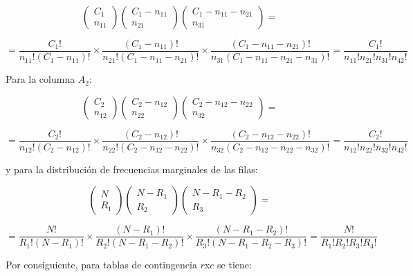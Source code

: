 \documentclass[12pt,a4paper,]{book}
\numberwithin{dummy}{section}
\theoremstyle{ocrenumbox}
\theoremstyle{blacknumex}
\theoremstyle{blacknumbox}
\theoremstyle{ocrenum}
\theoremstyle{ocrenum}
\begin{document}
\[
\left(\begin{array}{c}C_1\\ n_{11}\end{array}\right)\left(\begin{array}{c}C_1-n_{11}\\ n_{21}\end{array}\right)\left(\begin{array}{c}C_1-n_{11}-n_{21}\\ n_{31}\end{array}\right)=
\]

\[
=\frac{C_1!}{n_{11}!(C_1-n_{11})!}\times\frac{(C_1-n_{11})!}{n_{21}!(C_1-n_{11}-n_{21})!}\times\frac{(C_1-n_{11}-n_{21})!}{n_{31}(C_1-n_{11}-n_{21}-n_{31})!}=\frac{C_1!}{n_{11}!n_{21}!n_{31}!n_{42}!}
\]

Para la columna \(A_2\):

\[
\left(\begin{array}{c}C_2\\ n_{12}\end{array}\right)\left(\begin{array}{c}C_2-n_{12}\\ n_{22}\end{array}\right)\left(\begin{array}{c}C_2-n_{12}-n_{22}\\ n_{32}\end{array}\right)=
\]

\[
=\frac{C_2!}{n_{12}!(C_2-n_{12})!}\times\frac{(C_2-n_{12})!}{n_{22}!(C_2-n_{12}-n_{22})!}\times\frac{(C_2-n_{12}-n_{22})!}{n_{32}(C_2-n_{12}-n_{22}-n_{32})!}=\frac{C_2!}{n_{12}!n_{22}!n_{32}!n_{42}!}
\]

y para la distribución de frecuencias marginales de las filas:

\[
\left(\begin{array}{c}N\\ R_1\end{array}\right)\left(\begin{array}{c}N-R_1\\ R_2\end{array}\right)\left(\begin{array}{c}N-R_1-R_2\\ R_3\end{array}\right)=
\]

\[
=\frac{N!}{R_1!(N-R_1)!}\times\frac{(N-R_1)!}{R_2!(N-R_1-R_2)!}\times\frac{(N-R_1-R_2)!}{R_3!(N-R_1-R_2-R_3)!}=\frac{N!}{R_1!R_2!R_3!R_4!}
\]

Por consiguiente, para tablas de contingencia \(r\)x\(c\) se tiene:
\end{document}
